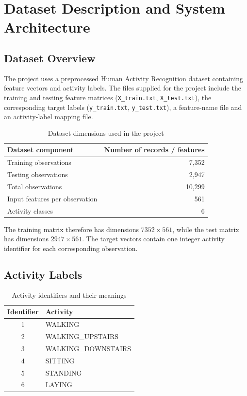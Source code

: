 \chapter{Dataset Description and System Architecture}
\section{Dataset Overview}
The project uses a preprocessed Human Activity Recognition dataset containing feature vectors and activity labels. The files supplied for the project include the training and testing feature matrices (\texttt{X\_train.txt}, \texttt{X\_test.txt}), the corresponding target labels (\texttt{y\_train.txt}, \texttt{y\_test.txt}), a feature-name file and an activity-label mapping file.

\begin{table}[H]
\centering
\caption{Dataset dimensions used in the project}
\begin{tabular}{lr}
\toprule
\textbf{Dataset component} & \textbf{Number of records / features}\\
\midrule
Training observations & 7,352\\
Testing observations & 2,947\\
Total observations & 10,299\\
Input features per observation & 561\\
Activity classes & 6\\
\bottomrule
\end{tabular}
\end{table}

The training matrix therefore has dimensions $7352 \times 561$, while the test matrix has dimensions $2947 \times 561$. The target vectors contain one integer activity identifier for each corresponding observation.

\section{Activity Labels}
\begin{table}[H]
\centering
\caption{Activity identifiers and their meanings}
\begin{tabular}{cl}
\toprule
\textbf{Identifier} & \textbf{Activity}\\
\midrule
1 & WALKING\\
2 & WALKING\_UPSTAIRS\\
3 & WALKING\_DOWNSTAIRS\\
4 & SITTING\\
5 & STANDING\\
6 & LAYING\\
\bottomrule
\end{tabular}
\end{table}

